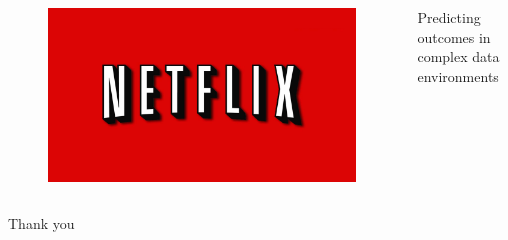 \documentclass[table]{beamer}
\begin{document}
\begin{frame}
\begin{columns}[t]
\begin{figure}
\includegraphics[width=0.8\linewidth]{netflix.png}
\end{figure}
Predicting outcomes in complex data environments
\end{columns}
  \vspace{1cm}
\large{\centerline{Thank you}}
\end{frame}
\end{document}
